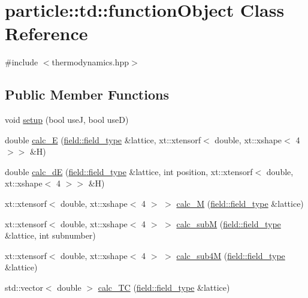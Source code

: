\hypertarget{classparticle_1_1td_1_1functionObject}{}\section{particle\+:\+:td\+:\+:function\+Object Class Reference}
\label{classparticle_1_1td_1_1functionObject}


{\ttfamily \#include $<$thermodynamics.\+hpp$>$}

\subsection*{Public Member Functions}
\begin{DoxyCompactItemize}
\item 
void \hyperlink{classparticle_1_1td_1_1functionObject_a983e51c31ec252ab0567eb70bc0a8631}{setup} (bool useJ, bool useD)
\item 
double \hyperlink{classparticle_1_1td_1_1functionObject_a7fe36af330daf78dbe7ce3897e6dad3f}{calc\+\_\+E} (\hyperlink{classparticle_1_1field_1_1field__type}{field\+::field\+\_\+type} \&lattice, xt\+::xtensorf$<$ double, xt\+::xshape$<$ 4 $>$$>$ \&H)
\item 
double \hyperlink{classparticle_1_1td_1_1functionObject_a057b7d5d3315a6a36efa470d4136ceb7}{calc\+\_\+dE} (\hyperlink{classparticle_1_1field_1_1field__type}{field\+::field\+\_\+type} \&lattice, int position, xt\+::xtensorf$<$ double, xt\+::xshape$<$ 4 $>$$>$ \&H)
\item 
xt\+::xtensorf$<$ double, xt\+::xshape$<$ 4 $>$ $>$ \hyperlink{classparticle_1_1td_1_1functionObject_a60a3f8d3dc9160864d6c05bc4583b8b7}{calc\+\_\+M} (\hyperlink{classparticle_1_1field_1_1field__type}{field\+::field\+\_\+type} \&lattice)
\item 
xt\+::xtensorf$<$ double, xt\+::xshape$<$ 4 $>$ $>$ \hyperlink{classparticle_1_1td_1_1functionObject_a1b92821d8ef6d7aee3d0baeaeef6db1f}{calc\+\_\+subM} (\hyperlink{classparticle_1_1field_1_1field__type}{field\+::field\+\_\+type} \&lattice, int subnumber)
\item 
xt\+::xtensorf$<$ double, xt\+::xshape$<$ 4 $>$ $>$ \hyperlink{classparticle_1_1td_1_1functionObject_a7fb6084592f51e11449ffd3b5f4a498c}{calc\+\_\+sub4M} (\hyperlink{classparticle_1_1field_1_1field__type}{field\+::field\+\_\+type} \&lattice)
\item 
std\+::vector$<$ double $>$ \hyperlink{classparticle_1_1td_1_1functionObject_aef4fdc9fa9647aa342978820c2c9a4fc}{calc\+\_\+\+TC} (\hyperlink{classparticle_1_1field_1_1field__type}{field\+::field\+\_\+type} \&lattice)
\end{DoxyCompactItemize}


